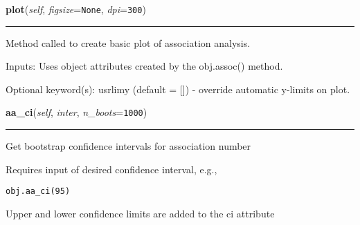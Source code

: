     \label{spacepy:poppy:PPro:plot}

    \vspace{0.5ex}

\hspace{.8\funcindent}\begin{boxedminipage}{\funcwidth}

    \raggedright \textbf{plot}(\textit{self}, \textit{figsize}={\tt None}, \textit{dpi}={\tt 300})

    \vspace{-1.5ex}

    \rule{\textwidth}{0.5\fboxrule}
\setlength{\parskip}{2ex}
    Method called to create basic plot of association analysis.

    Inputs: Uses object attributes created by the obj.assoc() method.

    Optional keyword(s): usrlimy (default = []) - override automatic 
    y-limits on plot.

\setlength{\parskip}{1ex}
    \end{boxedminipage}

    \label{spacepy:poppy:PPro:aa_ci}

    \vspace{0.5ex}

\hspace{.8\funcindent}\begin{boxedminipage}{\funcwidth}

    \raggedright \textbf{aa\_ci}(\textit{self}, \textit{inter}, \textit{n\_boots}={\tt 1000})

    \vspace{-1.5ex}

    \rule{\textwidth}{0.5\fboxrule}
\setlength{\parskip}{2ex}
    Get bootstrap confidence intervals for association number

    Requires input of desired confidence interval, e.g.,

\begin{alltt}
\pysrcprompt{{\textgreater}{\textgreater}{\textgreater} }obj.aa\_ci(95)\end{alltt}
    Upper and lower confidence limits are added to the ci attribute

\setlength{\parskip}{1ex}
    \end{boxedminipage}


